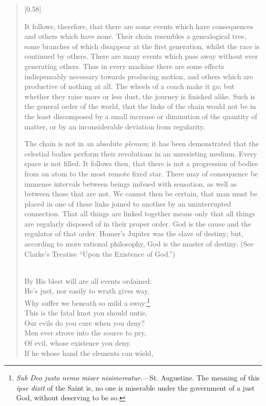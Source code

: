 \begin{verse}[0.58\textwidth]
{It follows, therefore, that there are some events which have
consequences and others which have none. Their chain resembles a
genealogical tree, some branches of which disappear at the first
generation, whilst the race is continued by others. There are many
events which pass away without ever generating others. Thus in every
machine there are some effects indispensably necessary towards
producing motion, and others which are productive of nothing at all.
The wheels of a coach make it go; but whether they raise more or less
dust, the journey is finished alike. Such is the general order of the
world, that the links of the chain would not be in the least
discomposed by a small increase or diminution of the quantity of
matter, or by an inconsiderable deviation from regularity.

The chain is not in an absolute \textit{plenum}; it has been
demonstrated that the celestial bodies perform their revolutions in an
unresisting medium. Every space is not filled. It follows then, that
there is not a progression of bodies from an atom to the most remote
fixed star. There may of consequence be immense intervals between
beings imbued with sensation, as well as between those that are not.
We cannot then be certain, that man must be placed in one of these
links joined to another by an uninterrupted connection. That all
things are linked together means only that all things are regularly
disposed of in their proper order. God is the cause and the regulator
of that order. Homer's Jupiter was the slave of destiny; but,
according to more rational philosophy, God is the master of destiny.
(See Clarke's Treatise ``Upon the Existence of God.'')}\\
By His blest will are all events ordained:\\
He's just, nor easily to wrath gives way,\\
Why suffer we beneath so mild a sway:\footnote{\textit{Sub
Deo justo nemo miser nisimereatur}.---St. Augustine. The meaning of
this \textit{ipse dixit} of the Saint is, no one is miserable under
the government of a just God, without deserving to be so.}\\
This is the fatal knot you should untie,\\
Our evils do you cure when you deny?\\
Men ever strove into the source to pry,\\
Of evil, whose existence you deny.\\
If he whose hand the elements can wield,\\

\end{verse}

